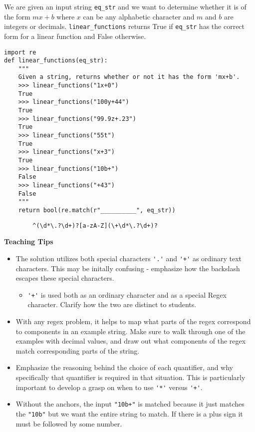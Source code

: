 \begin{blocksection}
\question We are given an input string \lstinline{eq_str} and we want to determine whether it is of the form 
$mx+b$ where $x$ can be any alphabetic character and $m$ and $b$ are integers or decimals. \lstinline{linear_functions} returns True if \lstinline{eq_str} 
has the correct form for a linear function and False otherwise.

\begin{lstlisting}
import re
def linear_functions(eq_str):
    """
    Given a string, returns whether or not it has the form 'mx+b'.
    >>> linear_functions("1x+0")
    True
    >>> linear_functions("100y+44")
    True
    >>> linear_functions("99.9z+.23")
    True
    >>> linear_functions("55t")
    True
    >>> linear_functions("x+3")
    True
    >>> linear_functions("10b+")
    False
    >>> linear_functions("+43")
    False
    """
    return bool(re.match(r"__________", eq_str))
\end{lstlisting}

\begin{solution}[2in]
    \begin{lstlisting}
        ^(\d*\.?\d+)?[a-zA-Z](\+\d*\.?\d+)?
    \end{lstlisting}
\end{solution}
\end{blocksection}

\begin{guide}
\begin{blocksection}
\textbf{Teaching Tips}
    \begin{itemize}
        \item The solution utilizes both special characters \lstinline$'.'$ and \lstinline$'+'$ as ordinary text characters. This may be initally confusing - emphasize how the backslash escapes these special characters.
        \begin{itemize}
            \item \lstinline$'+'$ is used both as an ordinary character and as a special Regex character. Clarify how the two are distinct to students.
        \end{itemize}
        \item With any regex problem, it helps to map what parts of the regex correspond to components in an example string. Make sure to walk through one of the examples with decimal values, and draw out what components of the regex match corresponding parts of the string.
        \item Emphasize the reasoning behind the choice of each quantifier, and why specifically that quantifier is required in that situation. This is particularly important to develop a grasp on when to use \lstinline$'*'$ versus \lstinline$'+'$.
        \item Without the anchors, the input \lstinline{"10b+"} is matched because it just matches the \lstinline{"10b"} but we want the entire string to match. If there is a plus sign it must be followed by some number.
    \end{itemize}
\end{blocksection}
\end{guide}
    